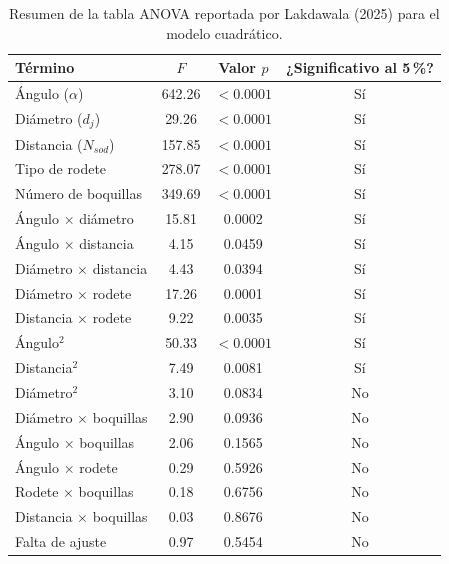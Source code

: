 \begin{table}[H]
\centering
\caption{Resumen de la tabla ANOVA reportada por Lakdawala (2025) para el modelo cuadrático.}
\label{tab:anova_original}
\begin{tabular}{lccc}
\toprule
Término & $F$ & Valor $p$ & ¿Significativo al 5\,\%? \\
\midrule
Ángulo ($\alpha$)                 & 642.26 & $<0.0001$ & Sí \\
Diámetro ($d_j$)                  & 29.26  & $<0.0001$ & Sí \\
Distancia ($N_{sod}$)             & 157.85 & $<0.0001$ & Sí \\
Tipo de rodete                    & 278.07 & $<0.0001$ & Sí \\
Número de boquillas               & 349.69 & $<0.0001$ & Sí \\
Ángulo $\times$ diámetro          & 15.81  & 0.0002    & Sí \\
Ángulo $\times$ distancia         & 4.15   & 0.0459    & Sí \\
Diámetro $\times$ distancia       & 4.43   & 0.0394    & Sí \\
Diámetro $\times$ rodete          & 17.26  & 0.0001    & Sí \\
Distancia $\times$ rodete         & 9.22   & 0.0035    & Sí \\
Ángulo$^2$                        & 50.33  & $<0.0001$ & Sí \\
Distancia$^2$                     & 7.49   & 0.0081    & Sí \\
Diámetro$^2$                      & 3.10   & 0.0834    & No \\
Diámetro $\times$ boquillas       & 2.90   & 0.0936    & No \\
Ángulo $\times$ boquillas         & 2.06   & 0.1565    & No \\
Ángulo $\times$ rodete            & 0.29   & 0.5926    & No \\
Rodete $\times$ boquillas         & 0.18   & 0.6756    & No \\
Distancia $\times$ boquillas      & 0.03   & 0.8676    & No \\
\midrule
Falta de ajuste                   & 0.97   & 0.5454    & No \\
\bottomrule
\end{tabular}
\end{table}

